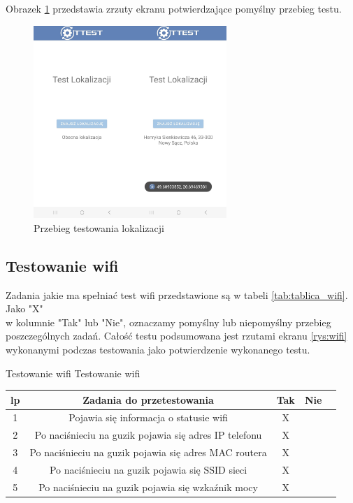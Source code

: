 Obrazek \ref{rys:gps} przedstawia zrzuty ekranu potwierdzające pomyślny przebieg testu.

\begin{figure}[!hbt]
	\begin{center}
		\includegraphics[angle=360, width=0.65\textwidth]{rys/punkt5/gps.jpg}
		\caption{Przebieg testowania lokalizacji}
		\label{rys:gps}
	\end{center}
\end{figure} 

\newpage


\subsection{Testowanie wifi}  

Zadania jakie ma spełniać test wifi przedstawione są w tabeli \ref{tab:tablica_wifi}. Jako "X" \\ w kolumnie "Tak" lub "Nie", oznaczamy pomyślny lub niepomyślny przebieg poszczególnych zadań. Całość testu podsumowana jest rzutami ekranu \ref{rys:wifi} wykonanymi podczas testowania jako potwierdzenie wykonanego testu.

\begin{tabela}
	{Testowanie wifi}	%
	{Testowanie wifi}	%
	{
		\begin{tabular}{|c|c|c|c|c|} \hline
			\textbf{lp} & \textbf{Zadania do przetestowania} & \textbf{Tak} & \textbf{Nie} \\ \hline
			1 & Pojawia się informacja o statusie wifi & X & ~ \\ \hline
			2 & Po naciśnieciu na guzik pojawia się adres IP telefonu & X & ~ \\ \hline
			3 & Po naciśnieciu na guzik pojawia się adres MAC routera & X & ~ \\ \hline
			4 & Po naciśnieciu na guzik pojawia się SSID sieci & X & ~ \\ \hline
			5 & Po naciśnieciu na guzik pojawia się wzkaźnik mocy & X & ~ \\ \hline
	\end{tabular}	}
	\label{tab:tablica_wifi}
\end{tabela}

